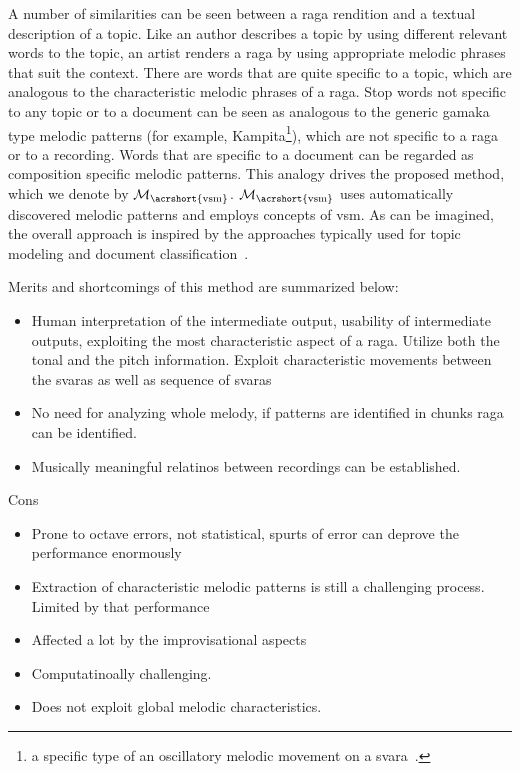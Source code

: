 A number of similarities can be seen between a \gls{raga} rendition and a textual description of a topic. Like an author describes a topic by using different relevant words to the topic, an artist renders a \gls{raga} by using appropriate melodic phrases that suit the context. There are words that are quite specific to a topic, which are analogous to the characteristic melodic phrases of a \gls{raga}. Stop words not specific to any topic or to a document can be seen as analogous to the generic gamaka type melodic patterns (for example, Kampita\footnote{a specific type of an oscillatory melodic movement on a svara~\cite{krishna2012carnatic}.}), which are not specific to a \gls{raga} or to a recording. Words that are specific to a document can be regarded as composition specific melodic patterns. This analogy drives the proposed method, which we denote by $\mathcal{M}_\mathrm{\acrshort{vsm}}$. $\mathcal{M}_\mathrm{\acrshort{vsm}}$ uses automatically discovered melodic patterns and employs concepts of \gls{vsm}. As can be imagined, the overall approach is inspired by the approaches typically used for topic modeling and document classification~.

Merits and shortcomings of this method are summarized below:
\begin{itemize}
	\item Human interpretation of the intermediate output, usability of intermediate outputs, exploiting the most characteristic aspect of a raga. Utilize both the tonal and the pitch information. Exploit characteristic movements between the svaras as well as sequence of svaras
	\item No need for analyzing whole melody, if patterns are identified in chunks raga can be identified.
	\item Musically meaningful relatinos between recordings can be established.
\end{itemize}

Cons
\begin{itemize}
	\item Prone to octave errors, not statistical, spurts of error can deprove the performance enormously
	\item Extraction of characteristic melodic patterns is still a challenging process. Limited by that performance
	\item Affected a lot by the improvisational aspects
	\item Computatinoally challenging. 
	\item Does not exploit global melodic characteristics.
\end{itemize}


